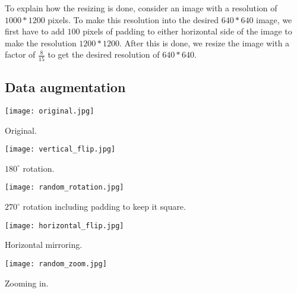 To explain how the resizing is done, 
consider an image with a resolution of $1000*1200$ pixels. 
To make this resolution into the desired $640*640$ image, 
we first have to add $100$ pixels of padding to either horizontal side of the image to make the resolution $1200*1200$. 
After this is done, we resize the image with a factor of $\frac{8}{15}$ to get the desired resolution of $640*640$.



\newpage
\subsection{Data augmentation}

\begin{marginfigure}
	\texttt{[image: original.jpg]}
	\caption{Original.}
\end{marginfigure}

\begin{marginfigure}
	\texttt{[image: vertical\_flip.jpg]}
	\caption{$180^{\circ}$ rotation.}
\end{marginfigure}

\begin{marginfigure}
	\texttt{[image: random\_rotation.jpg]}
	\caption{$270^{\circ}$ rotation including padding to keep it square.}
\end{marginfigure}

\begin{marginfigure}
	\texttt{[image: horizontal\_flip.jpg]}
	\caption{Horizontal mirroring.}
\end{marginfigure}

\begin{marginfigure}
	\texttt{[image: random\_zoom.jpg]}
	\caption{Zooming in.}
\end{marginfigure}

